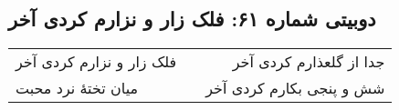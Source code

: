 \begin{center}
\section*{دوبیتی شماره ۶۱: فلک زار و نزارم کردی آخر}
\label{sec:061}
\begin{longtable}{l p{0.5cm} r}
فلک زار و نزارم کردی آخر
&&
جدا از گلعذارم کردی آخر
\\
میان تختهٔ نرد محبت
&&
شش و پنجی بکارم کردی آخر
\\
\end{longtable}
\end{center}
